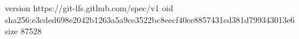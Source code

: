 version https://git-lfs.github.com/spec/v1
oid sha256:e3cded698e2042b1263a5a9ce3522bc8eecf40ee8857431ed381d799343013e6
size 87528
